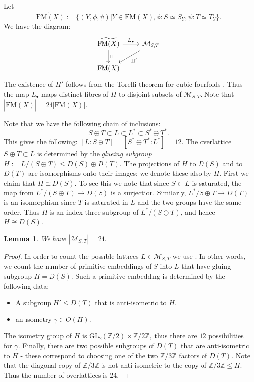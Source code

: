 \documentclass[11pt]{amsart}
\theoremstyle{plain}
\newtheorem{lemma}[theorem]{Lemma}
\numberwithin{equation}{section}
\theoremstyle{definition}
\theoremstyle{remark}
\newcommand{\GL}{\mathrm{GL}}
\newcommand{\bZ}{\mathbb{Z}}
\newcommand{\calM}{\mathcal{M}}
\begin{document}
Let 
$$\widetilde{\mathrm{FM}(X)}:=\{(Y,\phi,\psi)|Y\in \mathrm{FM}(X), \phi:S\simeq S_Y, \psi:T\simeq T_Y\}.$$
We have the diagram:
\begin{equation}\label{eDiagramFM}
\begin{tikzcd}
    \widetilde{\mathrm{FM}(X)} \arrow[r, "L_\bullet"] \arrow[d, "\Pi"] & \calM_{S,T}\arrow[ld, "\Pi'"]\\
    \mathrm{FM}(X) &
\end{tikzcd}
\end{equation}
The existence of $\Pi'$ follows from the Torelli theorem for cubic fourfolds \cite{voisintorelli}. Thus the map $L_\bullet$ maps distinct fibres of $\Pi$ to disjoint subsets of $\calM_{S,T}$. 
Note that $|\widetilde{\mathrm{FM}}(X)|=24|\mathrm{FM}(X)|.$

Note that we have the following chain of inclusions:
$$S\oplus T\subset L\subset L^\ast\subset S^\ast\oplus T^\ast.$$ This gives the following: $[L:S\oplus T]=[S^\ast\oplus T^\ast :L^\ast]=12.$ 
The overlattice $S\oplus T\subset L$ is determined by the \textit{glueing subgroup} $H:=L/(S\oplus T)\leq D(S)\oplus D(T).$ The projections of $H$ to $D(S)$ and to $D(T)$ are isomorphisms onto their images: we denote these also by $H$. First we claim that $H\cong D(S).$ To see this we note that since $S\subset L$ is saturated, the map from $L^\ast/(S\oplus T)\rightarrow D(S)$ is a surjection. Similarly, $L^\ast/ S\oplus T\rightarrow D(T)$ is an isomorphism since $T$ is saturated in $L$ and the two groups have the same order. Thus $H$ is an index three subgroup of $L^\ast/(S\oplus T)$, and hence $H\cong D(S).$


\begin{lemma}\label{lLatticeCount}
We have
     $|\calM_{S,T}|=24.$
\end{lemma}
\begin{proof}
In order to count the possible lattices $L\in \calM_{S,T}$ we use \cite[Proposition 1.5.1]{nikulin}. In other words, we count the number of primitive embeddings of $S$ into $L$ that have gluing subgroup $H=D(S).$ Such a primitive embedding is determined by the following data:
\begin{itemize}
    \item A subgroup $H'\leq D(T)$ that is anti-isometric to $H$.
    \item an isometry $\gamma \in O(H).$
\end{itemize}
The isometry group of $H$ is $\GL_2(\bZ/2)\times \bZ/2\bZ,$ thus there are $12$ possibilities for $\gamma.$ Finally, there are two possible subgroups of $D(T)$ that are anti-isometric to $H$ - these correspond to choosing one of the two $\bZ/3\bZ$ factors of $D(T)$. Note that the diagonal copy of $\bZ/3\bZ$ is not anti-isometric to the copy of $\bZ/3\bZ\leq H.$  Thus the number of overlattices is 24.
\end{proof}
\end{document}

